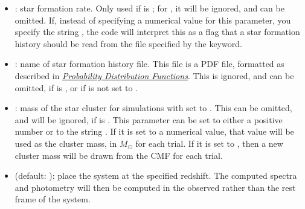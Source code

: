 \documentclass[letterpaper,10pt,english]{sphinxmanual}
\begin{document}
\begin{itemize}
\item {} 
: star formation rate. Only used if  is ; for , it will be ignored, and can be omitted. If, instead of specifying a numerical value for this parameter, you specify the string , the code will interpret this as a flag that a star formation history should be read from the file specified by the  keyword.

\item {} 
: name of star formation history file. This file is a PDF file, formatted as described in {\hyperref[pdfs:sec-pdfs]{\emph{Probability Distribution Functions}}}. This is ignored, and can be omitted, if  is , or if  is not set to .

\item {} 
: mass of the star cluster for simulations with  set to . This can be omitted, and will be ignored, if  is . This parameter can be set to either a positive number or to the string . If it is set to a numerical value, that value will be used as the cluster mass, in \(M_\odot\) for each trial. If it is set to , then a new cluster mass will be drawn from the CMF for each trial.

\item {} 
 (default: ): place the system at the specified redshift. The computed spectra and photometry will then be computed in the observed rather than the rest frame of the system.

\end{itemize}
\end{document}
